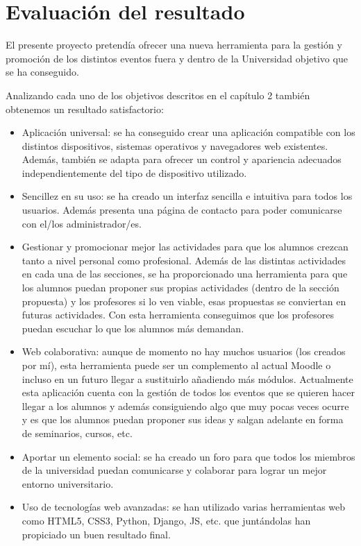 \cleardoublepage
\chapter{Evaluación del resultado}
\label{chap:evaluation}


El presente proyecto pretendía ofrecer una nueva herramienta para la gestión y promoción de los distintos eventos fuera y dentro de la Universidad objetivo que se ha conseguido.


Analizando cada uno de los objetivos descritos en el capítulo 2 también obtenemos un resultado satisfactorio:


\begin{itemize}
\item Aplicación universal: se ha conseguido crear una aplicación compatible con los distintos dispositivos, sistemas operativos y navegadores web existentes. Además, también se adapta para ofrecer un control y apariencia adecuados independientemente del tipo de dispositivo utilizado.
\item Sencillez en su uso: se ha creado un interfaz sencilla e intuitiva para todos los usuarios. Además presenta una página de contacto para poder comunicarse con el/los administrador/es.
\item Gestionar y promocionar mejor las actividades para que los alumnos crezcan tanto a nivel personal como profesional.  Además de las distintas actividades en cada una de las secciones, se ha proporcionado una herramienta para que los alumnos puedan proponer sus propias actividades (dentro de la sección propuesta) y los profesores si lo ven viable, esas propuestas se conviertan en futuras actividades. Con esta herramienta conseguimos que los profesores puedan escuchar lo que los alumnos más demandan.
\item Web colaborativa: aunque de momento no hay muchos usuarios (los creados por mí), esta herramienta puede ser un complemento al actual Moodle o incluso en un futuro llegar a sustituirlo añadiendo más módulos. Actualmente esta aplicación cuenta con la gestión de todos los eventos que se quieren hacer llegar a los alumnos y además consiguiendo algo que muy pocas veces ocurre y es que los alumnos puedan proponer sus ideas y salgan adelante en forma de seminarios, cursos, etc.
\item Aportar un elemento social: se ha creado un foro para que todos los miembros de la universidad puedan comunicarse y colaborar para lograr un mejor entorno universitario. 
\item Uso de tecnologías web avanzadas: se han utilizado varias herramientas web como HTML5, CSS3, Python, Django, JS, etc. que juntándolas han propiciado un buen resultado final.
\end{itemize}

